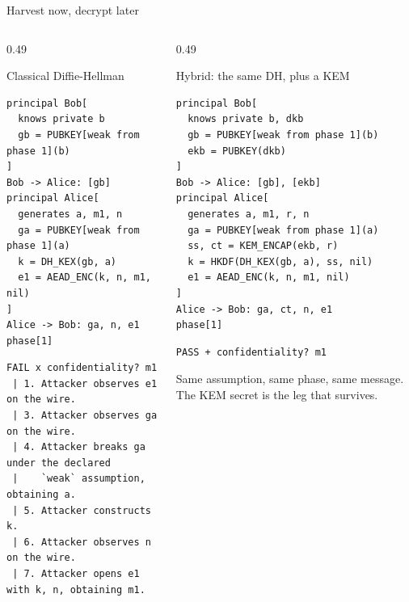 \ifdefined\PRESENTATION\else\PassOptionsToClass{handout}{beamer}\fi\documentclass[aspectratio=169, lualatex]{beamer}
\newcommand{\vpcode}{\fontsize{6}{6.4}\selectfont\ttfamily\color{vpink}}
\begin{document}
\begin{frame}[fragile]{Harvest now, decrypt later}
	\begin{columns}[t]
		\begin{column}{0.49\textwidth}
			\begin{vpmodel}[top=0.5mm, bottom=0.5mm]{Classical Diffie-Hellman}
				\begin{lstlisting}[basicstyle=\vpcode]
principal Bob[
  knows private b
  gb = PUBKEY[weak from phase 1](b)
]
Bob -> Alice: [gb]
principal Alice[
  generates a, m1, n
  ga = PUBKEY[weak from phase 1](a)
  k = DH_KEX(gb, a)
  e1 = AEAD_ENC(k, n, m1, nil)
]
Alice -> Bob: ga, n, e1
phase[1]
\end{lstlisting}
			\end{vpmodel}
			\vspace{0.1em}
			\begin{vpresult}[top=0.5mm, bottom=0.5mm]{}
				\begin{lstlisting}[basicstyle=\vpcode]
FAIL x confidentiality? m1
 | 1. Attacker observes e1 on the wire.
 | 3. Attacker observes ga on the wire.
 | 4. Attacker breaks ga under the declared
 |    `weak` assumption, obtaining a.
 | 5. Attacker constructs k.
 | 6. Attacker observes n on the wire.
 | 7. Attacker opens e1 with k, n, obtaining m1.
\end{lstlisting}
			\end{vpresult}
		\end{column}
		\begin{column}{0.49\textwidth}
			\begin{vpmodel}[top=0.5mm, bottom=0.5mm]{Hybrid: the same DH, plus a KEM}
				\begin{lstlisting}[basicstyle=\vpcode]
principal Bob[
  knows private b, dkb
  gb = PUBKEY[weak from phase 1](b)
  ekb = PUBKEY(dkb)
]
Bob -> Alice: [gb], [ekb]
principal Alice[
  generates a, m1, r, n
  ga = PUBKEY[weak from phase 1](a)
  ss, ct = KEM_ENCAP(ekb, r)
  k = HKDF(DH_KEX(gb, a), ss, nil)
  e1 = AEAD_ENC(k, n, m1, nil)
]
Alice -> Bob: ga, ct, n, e1
phase[1]
\end{lstlisting}
			\end{vpmodel}
			\vspace{0.1em}
			\begin{vpresult}[top=0.5mm, bottom=0.5mm]{}
				\begin{lstlisting}[basicstyle=\vpcode]
PASS + confidentiality? m1
\end{lstlisting}
			\end{vpresult}
			\vspace{0.2em}
			\scriptsize
			Same assumption, same phase, same message. The KEM secret is the leg that survives.
		\end{column}
	\end{columns}
\end{frame}
\end{document}

